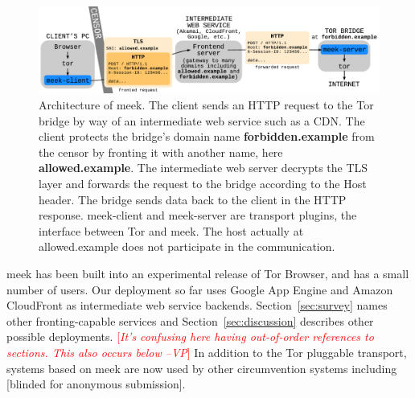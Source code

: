 \documentclass{sig-alternate}
\newcommand{\meekclient}{\mbox{meek-client}\xspace}
\newcommand{\meekserver}{\mbox{meek-server}\xspace}
\newcommand{\meek}{meek\xspace}
\def\urll#1{\begin{NoHyper}\url{#1}\end{NoHyper}}
\newcommand{\note}[1]{{\textcolor{red}{[\textit{#1}]}}}
\newcommand{\vp}[1]{\note{#1 --VP}}
\begin{document}
\begin{figure}
\centering
\includegraphics[width=\linewidth]{architecture}
\caption{
Architecture of \meek.
The client sends an HTTP request to the Tor bridge by way of an intermediate web service such as a CDN.
The client protects the bridge's domain name \textbf{forbidden.example} from the censor
by fronting it with another name, here \textbf{allowed.example}.
The intermediate web server decrypts the TLS layer and forwards the request to the bridge
according to the Host header.
The bridge sends data back to the client in the HTTP response.
\meekclient and \meekserver are transport plugins, the interface between Tor and \meek.
The host actually at allowed.example does not participate in the communication.
}
\label{fig:architecture}
\end{figure}

\meek has been built into an experimental release of Tor Browser,
and has a small number of users.
Our deployment so far uses Google App Engine and Amazon CloudFront
as intermediate web service backends.
Section~\ref{sec:survey} names other fronting-capable services
and Section~\ref{sec:discussion} describes other possible deployments.
\vp{It's confusing here having out-of-order references to sections.  This
also occurs below}
In addition to the Tor pluggable transport,
systems based on \meek are now used by other circumvention systems including
[blinded for anonymous submission].

\end{document}
